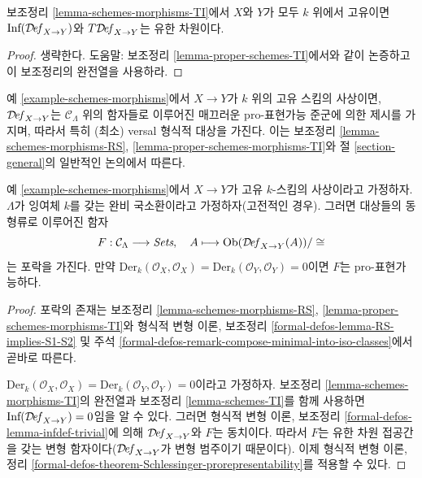 \begin{lemma}
\label{lemma-proper-schemes-morphisms-TI}
보조정리 \ref{lemma-schemes-morphisms-TI}에서 $X$와 $Y$가 모두
$k$ 위에서 고유이면 $\text{Inf}(\mathcal{D}\!\mathit{ef}_{X \to Y})$와
$T\mathcal{D}\!\mathit{ef}_{X \to Y}$는 유한 차원이다.
\end{lemma}

\begin{proof}
생략한다. 도움말: 보조정리 \ref{lemma-proper-schemes-TI}에서와 같이
논증하고 이 보조정리의 완전열을 사용하라.
\end{proof}

\noindent
예 \ref{example-schemes-morphisms}에서 $X \to Y$가 $k$ 위의 고유 스킴의
사상이면, $\mathcal{D}\!\mathit{ef}_{X \to Y}$는 $\mathcal{C}_\Lambda$ 위의
함자들로 이루어진 매끄러운 pro-표현가능 준군에 의한 제시를 가지며,
따라서 특히 (최소) versal 형식적 대상을 가진다. 이는 보조정리
\ref{lemma-schemes-morphisms-RS},
\ref{lemma-proper-schemes-morphisms-TI}와 절 \ref{section-general}의
일반적인 논의에서 따른다.

\begin{lemma}
\label{lemma-schemes-morphisms-hull}
예 \ref{example-schemes-morphisms}에서 $X \to Y$가 고유 $k$-스킴의
사상이라고 가정하자. $\Lambda$가 잉여체 $k$를 갖는 완비 국소환이라고
가정하자(고전적인 경우). 그러면 대상들의 동형류로 이루어진 함자
$$
F : \mathcal{C}_\Lambda \longrightarrow \textit{Sets},\quad
A \longmapsto \mathop{\mathrm{Ob}}\nolimits(\mathcal{D}\!\mathit{ef}_{X \to Y}(A))/\cong
$$
는 포락을 가진다. 만약
$\text{Der}_k(\mathcal{O}_X, \mathcal{O}_X) =
\text{Der}_k(\mathcal{O}_Y, \mathcal{O}_Y) = 0$이면
$F$는 pro-표현가능하다.
\end{lemma}

\begin{proof}
포락의 존재는 보조정리 \ref{lemma-schemes-morphisms-RS},
\ref{lemma-proper-schemes-morphisms-TI}와 형식적 변형 이론, 보조정리
\ref{formal-defos-lemma-RS-implies-S1-S2} 및 주석
\ref{formal-defos-remark-compose-minimal-into-iso-classes}에서 곧바로 따른다.

\medskip\noindent
$\text{Der}_k(\mathcal{O}_X, \mathcal{O}_X) =
\text{Der}_k(\mathcal{O}_Y, \mathcal{O}_Y) = 0$이라고 가정하자. 보조정리
\ref{lemma-schemes-morphisms-TI}의 완전열과 보조정리
\ref{lemma-schemes-TI}를 함께 사용하면
$\text{Inf}(\mathcal{D}\!\mathit{ef}_{X \to Y}) = 0$임을 알 수 있다.
그러면 형식적 변형 이론, 보조정리
\ref{formal-defos-lemma-infdef-trivial}에 의해
$\mathcal{D}\!\mathit{ef}_{X \to Y}$와 $F$는 동치이다. 따라서 $F$는 유한
차원 접공간을 갖는 변형 함자이다($\mathcal{D}\!\mathit{ef}_{X \to Y}$가
변형 범주이기 때문이다). 이제 형식적 변형 이론, 정리
\ref{formal-defos-theorem-Schlessinger-prorepresentability}를 적용할 수 있다.
\end{proof}

